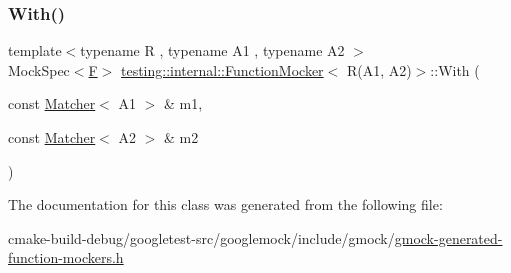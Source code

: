 \subsubsection{\texorpdfstring{With()}{With()}}
{\footnotesize\ttfamily template$<$typename R , typename A1 , typename A2 $>$ \\
Mock\+Spec$<$\mbox{\hyperlink{classtesting_1_1internal_1_1FunctionMocker_3_01R_07A1_00_01A2_08_4_a61302610bfc9b30588ea345e468310b2}{F}}$>$ \mbox{\hyperlink{classtesting_1_1internal_1_1FunctionMocker}{testing\+::internal\+::\+Function\+Mocker}}$<$ R(A1, A2)$>$\+::With (\begin{DoxyParamCaption}\item[{const \mbox{\hyperlink{classtesting_1_1Matcher}{Matcher}}$<$ A1 $>$ \&}]{m1,  }\item[{const \mbox{\hyperlink{classtesting_1_1Matcher}{Matcher}}$<$ A2 $>$ \&}]{m2 }\end{DoxyParamCaption})\hspace{0.3cm}{\ttfamily [inline]}}



The documentation for this class was generated from the following file\+:\begin{DoxyCompactItemize}
\item 
cmake-\/build-\/debug/googletest-\/src/googlemock/include/gmock/\mbox{\hyperlink{gmock-generated-function-mockers_8h}{gmock-\/generated-\/function-\/mockers.\+h}}\end{DoxyCompactItemize}
